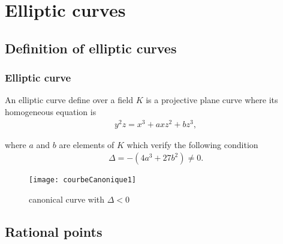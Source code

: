 \section{Elliptic curves}

\subsection{Definition of elliptic curves}

\begin{frame}[t]
    \frametitle{Elliptic curve}
    \begin{minipage}[t]{0.48\linewidth}
    \begin{definition}
        An elliptic curve define over a field $K$ is a projective plane curve where its
        homogeneous equation is
        \begin{align}
            \label{eq:ellipticCurve}
            y^2z = x^3 + axz^2 + b z^3
        ,\end{align}

        where $a$ and $b$ are elements of $K$ which verify the following condition
        \begin{align}
            \label{eq:delta}
        \Delta = - (4a^3 + 27 b^2) \neq 0
        .\end{align}
    \end{definition}
    \end{minipage}%
    \hfill%
    \begin{minipage}[t]{0.48\linewidth}
       \begin{figure}[h]
           \centering
           \texttt{[image: courbeCanonique1]}
           \caption{canonical curve with $\Delta < 0$}
           \label{fig:courbeCanonique1}
       \end{figure} 
    \end{minipage}
\end{frame}

\subsection{Rational points}

